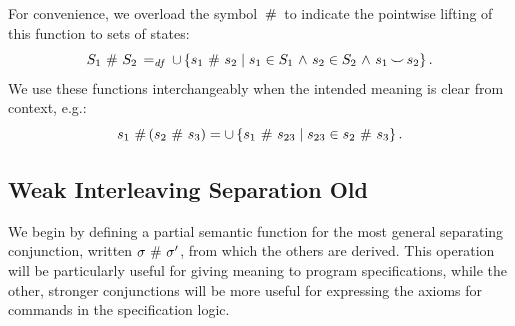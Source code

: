 \documentclass[11pt]{report}
\begin{document}
For convenience, we overload the symbol $\operatorname{\,\#\,}$ to indicate the pointwise lifting of this function to sets of states: \[ S_1 \operatorname{\,\#\,} S_2 \operatorname{\;=_{\mathit{df}}\;} \cup \left\lbrace s_1 \operatorname{\,\#\,} s_2 \mid s_1 \in S_1 \operatorname{\,\wedge\,} s_2 \in S_2 \operatorname{\,\wedge\,} s_1 \operatorname{\smile} s_2 \right\rbrace.\] We use these functions interchangeably when the intended meaning is clear from context, e.g.: \[ s_1 \operatorname{\,\#\,} (s_2 \operatorname{\,\#\,} s_3) = \cup \left\lbrace s_1 \operatorname{\,\#\,} s_{23} \mid s_{23} \in s_2 \operatorname{\,\#\,} s_3 \right\rbrace.\]


\subsection{Weak Interleaving Separation Old}

We begin by defining a partial semantic function for the most general separating conjunction, written $\sigma \operatorname{\,\#\,} \sigma'$, from which the others are derived. This operation will be particularly useful for giving meaning to program specifications, while the other, stronger conjunctions will be more useful for expressing the axioms for commands in the specification logic. 
\end{document}
